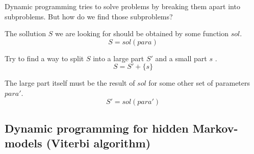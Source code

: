 Dynamic programming tries to solve problems by breaking them apart into subproblems. But how do we find those subproblems?

The sollution $S$ we are looking for should be obtained by some function $sol$.
$$ S = sol(para) $$

Try to find a way to split $S$ into a large part $S'$ and a small part $s$ .
$$ S = S' + \{ s \} $$

The large part itself must be the result of $sol$ for some other set of parameters $para'$.
$$ S' = sol(para') $$


\subsection{Dynamic programming for hidden Markov-models (Viterbi algorithm)}
